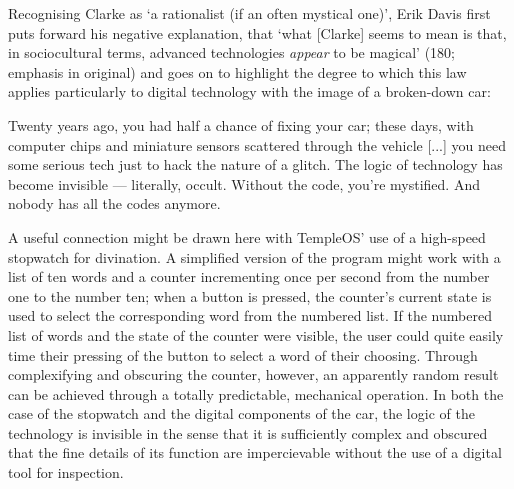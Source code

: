 Recognising Clarke as `a rationalist (if an often mystical one)',
Erik Davis first puts forward his negative explanation, that
`what [Clarke] seems to mean is that, in sociocultural terms, advanced
technologies \textit{appear} to be magical' (180; emphasis in original)
and goes on to highlight the degree to which this law applies particularly
to digital technology with the image of a broken-down car:
\begin{displayquote}
  Twenty years ago, you had half a chance of fixing your car; these days,
  with computer chips and miniature sensors scattered through the vehicle
  [...] you need some serious tech just to hack the nature of a glitch.
  The logic of technology has become invisible --- literally, occult.
  Without the code, you're mystified.
  And nobody has all the codes anymore.
\end{displayquote}
A useful connection might be drawn here with TempleOS' use of a high-speed
stopwatch for divination.
A simplified version of the program might work with a list of ten words
and a counter incrementing once per second from the number one to the number
ten; when a button is pressed, the counter's current state is used to
select the corresponding word from the numbered list.
If the numbered list of words and the state of the counter were visible,
the user could quite easily time their pressing of the button to select
a word of their choosing.
Through complexifying and obscuring the counter, however, an apparently
random result can be achieved through a totally predictable,
mechanical operation.
In both the case of the stopwatch and the digital components of the car,
the logic of the technology is invisible in the sense that
it is sufficiently complex and obscured that the fine details of
its function are impercievable without
the use of a digital tool for inspection.

